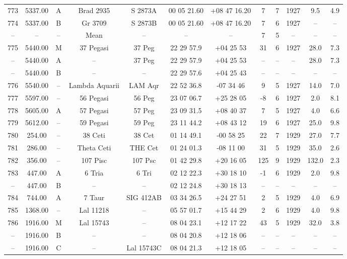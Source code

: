 \begin{table}
\begin{tabular}{cccccccccccc}
773 & 5337.00 & A & Brad 2935 & S 2873A & 00 05 21.60 & +08 47 16.20 & 7 & 7 & 1927 & 9.5 & 4.9 \\
774 & 5337.00 & B & Gr 3709 & S 2873B & 00 05 21.60 & +08 47 16.20 & 7 & 6 & 1927 & -- & -- \\
-- & -- & -- & Mean & -- & -- & -- & 7 & 5 & -- & -- & -- \\
775 & 5440.00 & M & 37 Pegasi & 37 Peg & 22 29 57.9 & +04 25 53 & 31 & 6 & 1927 & 28.0 & 7.3 \\
-- & 5440.00 & A & -- & 37 Peg & 22 29 57.9 & +04 25 53 & -- & -- & -- & 28.0 & 7.3 \\
-- & 5440.00 & B & -- & -- & 22 29 57.6 & +04 25 43 & -- & -- & -- & -- & -- \\
776 & 5540.00 & -- & Lambda Aquarii & LAM Aqr & 22 52 36.8 & -07 34 46 & 9 & 5 & 1927 & 14.0 & 7.0 \\
777 & 5597.00 & -- & 56 Pegasi & 56 Peg & 23 07 06.7 & +25 28 05 & -8 & 6 & 1927 & 2.0 & 8.1 \\
778 & 5605.00 & A & 57 Pegasi & 57 Peg & 23 09 31.5 & +08 40 37 & 7 & 5 & 1927 & 4.0 & 6.6 \\
779 & 5612.00 & -- & 59 Pegasi & 59 Peg & 23 11 44.2 & +08 43 12 & 19 & 6 & 1927 & 25.0 & 9.8 \\
780 & 254.00 & -- & 38 Ceti & 38 Cet & 01 14 49.1 & -00 58 25 & 22 & 7 & 1929 & 27.0 & 7.7 \\
781 & 286.00 & -- & Theta Ceti & THE Cet & 01 24 01.3 & -08 11 00 & 31 & 5 & 1929 & 35.0 & 2.6 \\
782 & 356.00 & -- & 107 Pisc & 107 Psc & 01 42 29.8 & +20 16 05 & 125 & 9 & 1929 & 132.0 & 2.3 \\
783 & 447.00 & A & 6 Tria & 6 Tri & 02 12 22.3 & +30 18 10 & -1 & 6 & 1929 & 2.0 & 9.8 \\
-- & 447.00 & B & -- & -- & 02 12 24.8 & +30 18 13 & -- & -- & -- & -- & -- \\
784 & 744.00 & A & 7 Taur & SIG 412AB & 03 34 26.5 & +24 27 51 & 2 & 5 & 1929 & 4.0 & 6.9 \\
785 & 1368.00 & -- & Lal 11218 & -- & 05 57 01.7 & +15 44 29 & 2 & 6 & 1929 & 4.0 & 9.8 \\
786 & 1916.00 & M & Lal 15743 & -- & 08 04 23.1 & +12 17 22 & 43 & 5 & 1929 & 32.0 & 3.8 \\
-- & 1916.00 & B & -- & -- & 08 04 20.8 & +12 18 06 & -- & -- & -- & -- & -- \\
-- & 1916.00 & C & -- & Lal 15743C & 08 04 21.3 & +12 18 05 & -- & -- & -- & -- & -- \\

\end{tabular}
\end{table}
